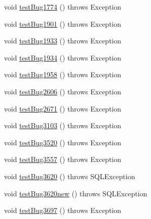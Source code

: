 \begin{DoxyCompactItemize}
\item 
void \mbox{\hyperlink{classtestsuite_1_1regression_1_1_statement_regression_test_add9e8195c4dbc3b4b95a1bc7ee5f5066}{test\+Bug1774}} ()  throws Exception 
\item 
void \mbox{\hyperlink{classtestsuite_1_1regression_1_1_statement_regression_test_aee25d7d22ab4c6ef36bab834d6dacc99}{test\+Bug1901}} ()  throws Exception 
\item 
void \mbox{\hyperlink{classtestsuite_1_1regression_1_1_statement_regression_test_a61d09502580908ecb2e973f8f3f22d51}{test\+Bug1933}} ()  throws Exception 
\item 
void \mbox{\hyperlink{classtestsuite_1_1regression_1_1_statement_regression_test_ae2d0f6ab42a969173a360bf53143ef7d}{test\+Bug1934}} ()  throws Exception 
\item 
void \mbox{\hyperlink{classtestsuite_1_1regression_1_1_statement_regression_test_a83011075c00abbedc8e7d79f2ffb6661}{test\+Bug1958}} ()  throws Exception 
\item 
void \mbox{\hyperlink{classtestsuite_1_1regression_1_1_statement_regression_test_aa53278612006c285096de5d15c6e17aa}{test\+Bug2606}} ()  throws Exception 
\item 
void \mbox{\hyperlink{classtestsuite_1_1regression_1_1_statement_regression_test_a85e39314f65a8b5de7bf5da11ed1fcad}{test\+Bug2671}} ()  throws Exception 
\item 
void \mbox{\hyperlink{classtestsuite_1_1regression_1_1_statement_regression_test_a9c642be3e679b82dbf2a033e2f09e90b}{test\+Bug3103}} ()  throws Exception 
\item 
void \mbox{\hyperlink{classtestsuite_1_1regression_1_1_statement_regression_test_a18dbb1cd4de47766732bd187315d645c}{test\+Bug3520}} ()  throws Exception 
\item 
void \mbox{\hyperlink{classtestsuite_1_1regression_1_1_statement_regression_test_addf4861dd4d40e523b54ffc88ff0e1f9}{test\+Bug3557}} ()  throws Exception 
\item 
void \mbox{\hyperlink{classtestsuite_1_1regression_1_1_statement_regression_test_aff7b0f7e5043e4a16d128d96ad607be6}{test\+Bug3620}} ()  throws S\+Q\+L\+Exception 
\item 
void \mbox{\hyperlink{classtestsuite_1_1regression_1_1_statement_regression_test_a1e239d5a9f63b634b11ab2451ef579eb}{test\+Bug3620new}} ()  throws S\+Q\+L\+Exception 
\item 
void \mbox{\hyperlink{classtestsuite_1_1regression_1_1_statement_regression_test_a2977c93f45f1a9ec78b20348f2d4e290}{test\+Bug3697}} ()  throws Exception 

\end{DoxyCompactItemize}
